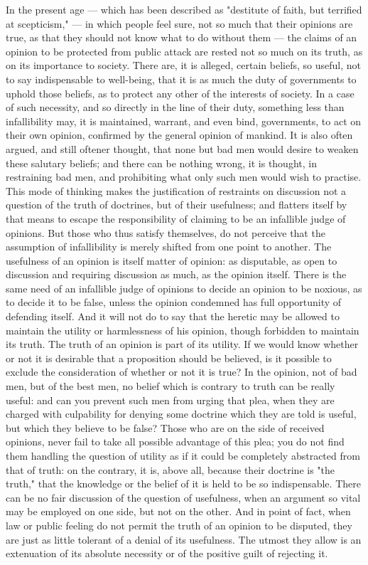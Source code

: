 \documentclass[12pt]{report}
\begin{document}
In the present age — which has been described as "destitute of faith, but terrified at scepticism," — in which people feel sure, not so much that their opinions are true, as that they should not know what to do without them — the claims of an opinion to be protected from public attack are rested not so much on its truth, as on its importance to society. There are, it is alleged, certain beliefs, so useful, not to say indispensable to well-being, that it is as much the duty of governments to uphold those beliefs, as to protect any other of the interests of society. In a case of such necessity, and so directly in the line of their duty, something less than infallibility may, it is maintained, warrant, and even bind, governments, to act on their own opinion, confirmed by the general opinion of mankind. It is also often argued, and still oftener thought, that none but bad men would desire to weaken these salutary beliefs; and there can be nothing wrong, it is thought, in restraining bad men, and prohibiting what only such men would wish to practise. This mode of thinking makes the justification of restraints on discussion not a question of the truth of doctrines, but of their usefulness; and flatters itself by that means to escape the responsibility of claiming to be an infallible judge of opinions. But those who thus satisfy themselves, do not perceive that the assumption of infallibility is merely shifted from one point to another. The usefulness of an opinion is itself matter of opinion: as disputable, as open to discussion and requiring discussion as much, as the opinion itself. There is the same need of an infallible judge of opinions to decide an opinion to be noxious, as to decide it to be false, unless the opinion condemned has full opportunity of defending itself. And it will not do to say that the heretic may be allowed to maintain the utility or harmlessness of his opinion, though forbidden to maintain its truth. The truth of an opinion is part of its utility. If we would know whether or not it is desirable that a proposition should be believed, is it possible to exclude the consideration of whether or not it is true? In the opinion, not of bad men, but of the best men, no belief which is contrary to truth can be really useful: and can you prevent such men from urging that plea, when they are charged with culpability for denying some doctrine which they are told is useful, but which they believe to be false? Those who are on the side of received opinions, never fail to take all possible advantage of this plea; you do not find them handling the question of utility as if it could be completely abstracted from that of truth: on the contrary, it is, above all, because their doctrine is "the truth," that the knowledge or the belief of it is held to be so indispensable. There can be no fair discussion of the question of usefulness, when an argument so vital may be employed on one side, but not on the other. And in point of fact, when law or public feeling do not permit the truth of an opinion to be disputed, they are just as little tolerant of a denial of its usefulness. The utmost they allow is an extenuation of its absolute necessity or of the positive guilt of rejecting it.
\end{document}
